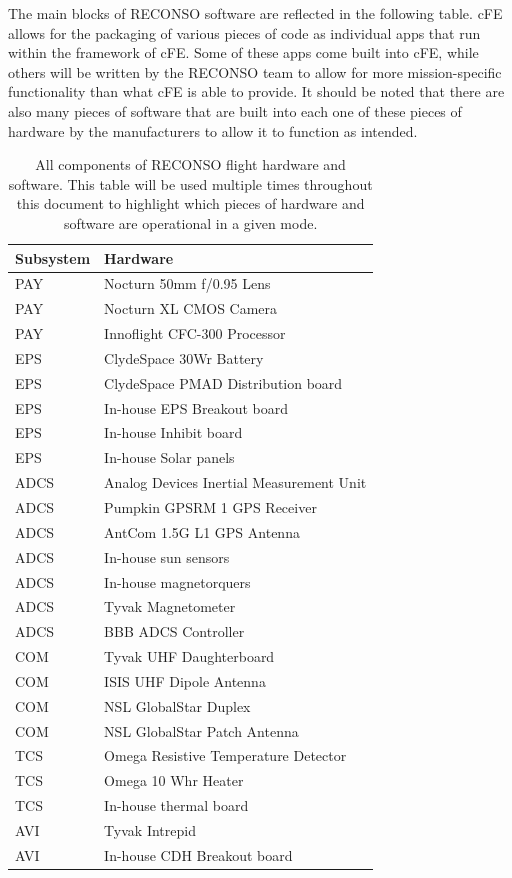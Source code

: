 \documentclass{article}
\begin{document}
The main blocks of RECONSO software are reflected in the following table. cFE allows for the packaging of various pieces of code as individual apps that run within the framework of cFE. Some of these apps come built into cFE, while others will be written by the RECONSO team to allow for more mission-specific functionality than what cFE is able to provide. It should be noted that there are also many pieces of software that are built into each one of these pieces of hardware by the manufacturers to allow it to function as intended.

\begin{table}[h!]
\caption{All components of RECONSO flight hardware and software. This table will be used multiple times throughout this document to highlight which pieces of hardware and software are operational in a given mode.}
\begin{adjustbox}{center}
\begin{tabular}{|l|l|}
\hline
Subsystem & Hardware \\ \hline \hline
PAY & Nocturn 50mm f/0.95 Lens  \\ \hline
PAY & Nocturn XL CMOS Camera  \\ \hline
PAY & Innoflight CFC-300 Processor  \\ \hline \hline
EPS & ClydeSpace 30Wr Battery \\ \hline
EPS & ClydeSpace PMAD Distribution board  \\ \hline
EPS & In-house EPS Breakout board \\ \hline
EPS & In-house Inhibit board  \\ \hline
EPS & In-house Solar panels  \\ \hline \hline
ADCS & Analog Devices Inertial Measurement Unit  \\ \hline
ADCS & Pumpkin GPSRM 1 GPS Receiver \\ \hline
ADCS & AntCom 1.5G L1 GPS Antenna  \\ \hline
ADCS & In-house sun sensors  \\ \hline
ADCS & In-house magnetorquers  \\ \hline
ADCS & Tyvak Magnetometer \\ \hline
ADCS & BBB ADCS Controller \\ \hline \hline
COM & Tyvak UHF Daughterboard  \\ \hline
COM & ISIS UHF Dipole Antenna  \\ \hline
COM & NSL GlobalStar Duplex  \\ \hline
COM & NSL GlobalStar Patch Antenna \\ \hline \hline
TCS & Omega Resistive Temperature Detector \\ \hline
TCS & Omega 10 Whr Heater  \\ \hline
TCS & In-house thermal board \\ \hline \hline
AVI & Tyvak Intrepid \\ \hline
AVI & In-house CDH Breakout board \\ \hline 
\end{tabular}


\end{adjustbox}
\end{table}
\end{document}
